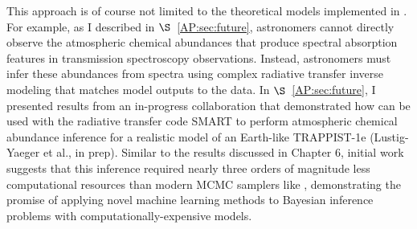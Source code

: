 This approach is of course not limited to the theoretical models implemented in \vplanet. For example, as I described in $\S$~\ref{AP:sec:future}, astronomers cannot directly observe the atmospheric chemical abundances that produce spectral absorption features in transmission spectroscopy observations. Instead, astronomers must infer these abundances from spectra using complex radiative transfer inverse modeling that matches model outputs to the data. In $\S$~\ref{AP:sec:future}, I presented results from an in-progress collaboration that demonstrated how \approxposterior can be used with the radiative transfer code SMART \citep{Meadows1996,Crisp1997} to perform atmospheric chemical abundance inference for a realistic model of an Earth-like TRAPPIST-1e (Lustig-Yaeger et al., in prep). Similar to the results discussed in Chapter 6, initial work suggests that this inference required nearly three orders of magnitude less computational resources than modern MCMC samplers like \emcee, demonstrating the promise of applying novel machine learning methods to Bayesian inference problems with computationally-expensive models.

